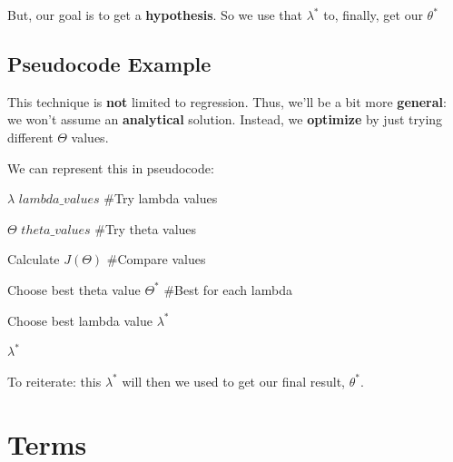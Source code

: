         But, our goal is to get a \textbf{hypothesis}. So we use that $\lambda^*$ to, finally, get our $\theta^*$
        
    \subsection{Pseudocode Example}
        
        This technique is \textbf{not} limited to regression. Thus, we'll be a bit more \textbf{general}: we won't assume an \textbf{analytical} solution. Instead, we \textbf{optimize} by just trying different $\Theta$ values.
        
        We can represent this in pseudocode:
        
        \begin{codebox}
                       
                \li \For $\lambda$ \In $lambda\_values$        
                \qquad\quad\#Try lambda values
                
                \li     \Do \For $\Theta$ \In $theta\_values$  
                \qquad\quad\#Try theta values    
                            \Do

                                \li Calculate $J(\Theta)$    
                                \qquad\qquad\qquad\#Compare values
                            \End
                        
                        \li Choose best theta value $\Theta^*$ 
                        \quad\#Best for each lambda

                        \End
                \li Choose best lambda value $\lambda^*$
                \li
                    
                \li \Return $\lambda^*$
        \end{codebox}
        
    To reiterate: this $\lambda^*$ will then we used to get our final result, $\theta^*$.
        
\section{Terms}

